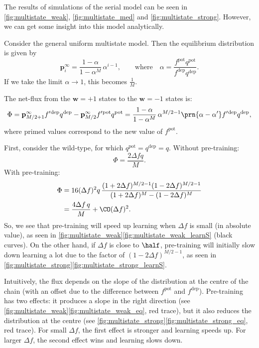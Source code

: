 \documentclass[12pt]{article}
\newcommand{\pr}{\mathbf{p}}
\newcommand{\eq}{\pr^\infty}
\newcommand{\w}{\mathbf{w}}
\newcommand{\pot}{^{\text{pot}}}
\newcommand{\dep}{^{\text{dep}}}
\begin{document}
The results of simulations of the serial model can be seen in \autoref{fig:multistate_weak}, \autoref{fig:multistate_med} and \autoref{fig:multistate_strong}.
However, we can get some insight into this model analytically.



Consider the general uniform multistate model.
Then the equilibrium distribution is given by
%
\begin{equation}\label{eq:mutltieq}
  \eq_i = \frac{1-\alpha}{1-\alpha^M}\,\alpha^{i-1},
  \qquad \text{where} \quad
  \alpha=\frac{f\pot q\pot}{f\dep q\dep}.
\end{equation}
%
If we take the limit $\alpha\rightarrow1$, this becomes $\frac{1}{M}$.

The net-flux from the $\w=+1$ states to the $\w=-1$ states is:
%
\begin{equation}\label{eq:multiflux}
  \Phi = \eq_{M/2+1}f'{}\dep q\dep - \eq_{M/2}f'{}\pot q\pot = \frac{1-\alpha}{1-\alpha^M}\,\alpha^{M/2-1}\prn{\alpha-\alpha'}f'{}\dep q\dep,
\end{equation}
%
where primed values correspond to the new value of $f\pot$.

First, consider the wild-type, for which $q\pot=q\dep=q$.
Without pre-training:
%
\begin{equation}\label{eq:multiWTnopre}
  \Phi = \frac{2{\Delta f}q}{M}.
\end{equation}
%
With pre-training:
%
\begin{equation}\label{eq:multiWTpre}
\begin{aligned}
  \Phi &= 16(\Delta f)^2q \, \frac{(1+2\Delta f)^{M/2-1} (1-2\Delta f)^{M/2-1}}
          {(1+2\Delta f)^M - (1-2\Delta f)^M} \\
       &= \frac{4{\Delta f}\,q}{M} + \CO(\Delta f)^2.
\end{aligned}
\end{equation}
%
So, we see that pre-training will speed up learning when $\Delta f$ is small (in absolute value), as seen in \autoref{fig:multistate_weak}\ref{fig:multistate_weak_learnS} (black curves).
On the other hand, if $\Delta f$ is close to $\half$, pre-training will initially slow down learning a lot due to the factor of $(1-2\Delta f)^{M/2-1}$, as seen in \autoref{fig:multistate_strong}\ref{fig:multistate_strong_learnS}.

Intuitively, the flux depends on the slope of the distribution at the centre of the chain (with an offset due to the difference between $f\pot$ and $f\dep$).
Pre-training has two effects: it produces a slope in the right direction (see \autoref{fig:multistate_weak}\ref{fig:multistate_weak_eq}, red trace), but it also reduces the distribution at the centre (see \autoref{fig:multistate_strong}\ref{fig:multistate_strong_eq}, red trace).
For small $\Delta f$, the first effect is stronger and learning speeds up.
For larger $\Delta f$, the second effect wins and learning slows down.
\end{document}
